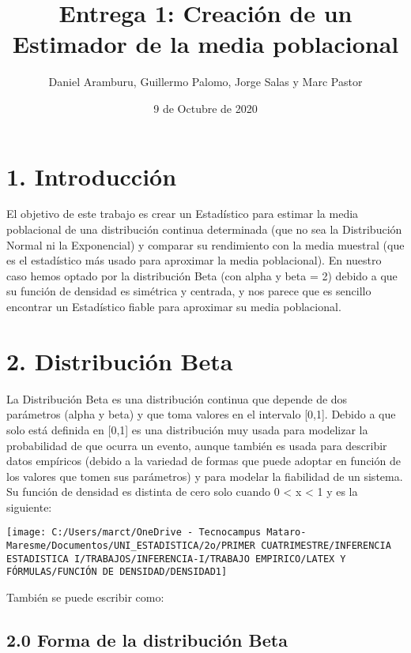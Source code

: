 \documentclass[
]{article}
\title{Entrega 1: Creación de un Estimador de la media poblacional}
\author{Daniel Aramburu, Guillermo Palomo, Jorge Salas y Marc Pastor}
\date{9 de Octubre de 2020}
\begin{document}
\maketitle

\hypertarget{introducciuxf3n}{%
\section{1. Introducción}\label{introducciuxf3n}}

El objetivo de este trabajo es crear un Estadístico para estimar la
media poblacional de una distribución continua determinada (que no sea
la Distribución Normal ni la Exponencial) y comparar su rendimiento con
la media muestral (que es el estadístico más usado para aproximar la
media poblacional). En nuestro caso hemos optado por la distribución
Beta (con alpha y beta = 2) debido a que su función de densidad es
simétrica y centrada, y nos parece que es sencillo encontrar un
Estadístico fiable para aproximar su media poblacional.

\hypertarget{distribuciuxf3n-beta}{%
\section{2. Distribución Beta}\label{distribuciuxf3n-beta}}

La Distribución Beta es una distribución continua que depende de dos
parámetros (alpha y beta) y que toma valores en el intervalo {[}0,1{]}.
Debido a que solo está definida en {[}0,1{]} es una distribución muy
usada para modelizar la probabilidad de que ocurra un evento, aunque
también es usada para describir datos empíricos (debido a la variedad de
formas que puede adoptar en función de los valores que tomen sus
parámetros) y para modelar la fiabilidad de un sistema. Su función de
densidad es distinta de cero solo cuando 0 \textless{} x \textless{} 1 y
es la siguiente:

\begin{center}\texttt{[image: C:/Users/marct/OneDrive - Tecnocampus Mataro-Maresme/Documentos/UNI\_ESTADISTICA/2o/PRIMER CUATRIMESTRE/INFERENCIA ESTADISTICA I/TRABAJOS/INFERENCIA-I/TRABAJO EMPIRICO/LATEX Y FÓRMULAS/FUNCIÓN DE DENSIDAD/DENSIDAD1]} \end{center}

También se puede escribir como:

\hypertarget{forma-de-la-distribuciuxf3n-beta}{%
\subsection{2.0 Forma de la distribución
Beta}\label{forma-de-la-distribuciuxf3n-beta}}
\end{document}

